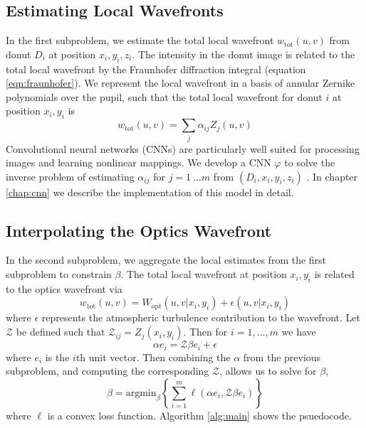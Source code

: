 \subsection{Estimating Local Wavefronts}
In the first subproblem, we estimate the total local wavefront $w_{\text{tot}}(u,v)$ from donut $D_i$ at position $x_i, y_i, z_i$. The intensity in the donut image is related to the total local wavefront by the Fraunhofer diffraction integral (equation \ref{eqn:fraunhofer}). We represent the local wavefront in a basis of annular Zernike polynomials over the pupil, such that the total local wavefront for donut $i$ at position $x_i, y_i$ is
\begin{equation}
w_{\text{tot}}(u,v) = \sum_j \alpha_{ij}Z_j(u,v)
\end{equation}
Convolutional neural networks (CNNs) are particularly well suited for processing images and learning nonlinear mappings. We develop a CNN $\varphi$ to solve the inverse problem of estimating $\alpha_{ij}$ for $j = 1\ \dots m$ from $(D_i,x_i,y_i,z_i)$ . In chapter \ref{chap:cnn} we describe the implementation of this model in detail. 

\subsection{Interpolating the Optics Wavefront}

In the second subproblem, we aggregate the local estimates from the first subproblem to constrain $\beta$. The total local wavefront at position $x_i,y_i$ is related to the optics wavefront via
\begin{equation}w_{\text{tot}}(u,v) = W_{\text{opt}}(u,v|x_i,y_i) + \epsilon(u,v|x_i,y_i)\end{equation}
where $\epsilon$ represents the atmospheric turbulence contribution to the wavefront. Let $\mathcal{Z}$ be defined such that $\mathcal{Z}_{ij} = Z_j(x_i,y_i)$. Then for $i = 1,\dots,m$ we have
\begin{equation}
\alpha e_i = \mathcal{Z} \beta e_i + \epsilon
\end{equation}
where $e_i$ is the $i$th unit vector. Then combining the $\alpha$ from the previous subproblem, and computing the corresponding $\mathcal{Z}$, allows us to solve for $\beta$,
\begin{equation}
\beta = \text{argmin}_{\beta}\left \{\sum_{i=1}^m \ell(\alpha e_i, \mathcal{Z} \beta e_i)\right\}
\end{equation}
where $\ell$ is a convex loss function. Algorithm \ref{alg:main} shows the psuedocode. 

